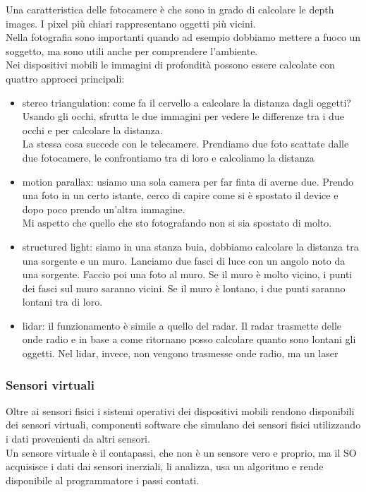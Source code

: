 Una caratteristica delle fotocamere è che sono in grado di calcolare le depth images. I pixel più chiari rappresentano oggetti più vicini. 
\\ Nella fotografia sono importanti quando ad esempio dobbiamo mettere a fuoco un soggetto, ma sono utili anche per comprendere l'ambiente.
\\ Nei dispositivi mobili le immagini di profondità possono essere calcolate con quattro approcci principali: 
\begin{itemize}
    \item stereo triangulation: come fa il cervello a calcolare la distanza dagli oggetti? Usando gli occhi, sfrutta le due immagini per vedere le differenze tra i due occhi e per calcolare la distanza.
    \\ La stessa cosa succede con le telecamere. Prendiamo due foto scattate dalle due fotocamere, le confrontiamo tra di loro e calcoliamo la distanza
    \item motion parallax: usiamo una sola camera per far finta di averne due. Prendo una foto in un certo istante, cerco di capire come si è spostato il device e dopo poco prendo un'altra immagine. 
    \\ Mi aspetto che quello che sto fotografando non si sia spostato di molto. 
    \item structured light: siamo in una stanza buia, dobbiamo calcolare la distanza tra una sorgente e un muro. Lanciamo due fasci di luce con un angolo noto da una sorgente. Faccio poi una foto al muro. Se il muro è molto vicino, i punti dei fasci sul muro saranno vicini. Se il muro è lontano, i due punti saranno lontani tra di loro.
    \item lidar: il funzionamento è simile a quello del radar. Il radar trasmette delle onde radio e in base a come ritornano posso calcolare quanto sono lontani gli oggetti. Nel lidar, invece, non vengono trasmesse onde radio, ma un laser
\end{itemize}

\subsubsection{Sensori virtuali}
Oltre ai sensori fisici i sistemi operativi dei dispositivi mobili rendono disponibili dei sensori virtuali, componenti software che simulano dei sensori fisici utilizzando i dati provenienti da altri sensori. 
\\ Un sensore virtuale è il contapassi, che non è un sensore vero e proprio, ma il SO acquisisce i dati dai sensori inerziali, li analizza, usa un algoritmo e rende disponibile al programmatore i passi contati. 

